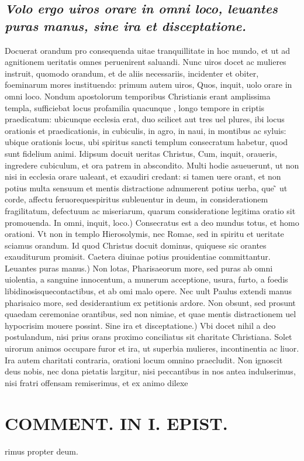 \documentclass{article}
\begin{document}
\begin{pages}
\subsection*{\textit{Volo ergo uiros orare in omni loco, leuantes puras manus, sine ira et disceptatione. }}\pstart Docuerat orandum pro consequenda uitae tranquillitate in hoc mundo, et ut ad agnitionem ueritatis omnes peruenirent saluandi. Nunc uiros docet ac mulieres instruit, quomodo orandum, et de aliis necessariis, incidenter et obiter, foeminarum mores instituendo: primum autem uiros, Quos, inquit, uolo orare in omni loco. Nondum apostolorum temporibus Christianis erant amplissima templa, sufficiebat locus profamilia quacunque , longo tempore in criptis praedicatum: ubicunque  ecclesia erat, duo scilicet aut tres uel plures, ibi locus orationis et praedicationis, in cubiculis, in agro, in naui, in montibus ac syluis: ubique  orationis locus, ubi spiritus sancti templum consecratum habetur, quod sunt fidelium animi. Idipsum docuit ueritas Christus, Cum, inquit, oraueris, ingredere cubiculum, et ora patrem in abscondito. Multi hodie asueuerunt, ut non nisi in ecclesia orare ualeant, et exaudiri credant: si tamen uere orant, et non potius multa sensuum et mentis distractione adnumerent potius uerba, que ̃ ut corde, affectu feruorequespiritus subleuentur in deum, in considerationem fragilitatum, defectuum ac miseriarum, quarum consideratione legitima oratio sit promouenda. In omni, inquit, loco.) Consecratus est a deo mundus totus, et homo orationi. Vt non in templo Hierosolymis, nec Romae, sed in spiritu et ueritate sciamus orandum. Id quod Christus docuit dominus, quiquese sic orantes exauditurum promisit. Caetera diuinae potius prouidentiae committantur. Leuantes puras manus.) Non lotas, Pharisaeorum more, sed puras ab omni uiolentia, a sanguine innocentum, a munerum acceptione, usura, furto, a foedis libidinosisquecontactibus, et ab omi malo opere. Nec uult Paulus extendi manus pharisaico more, sed desiderantium ex petitionis ardore. Non obsunt, sed prosunt quaedam ceremoniae orantibus, sed non nimiae, et quae mentis distractionem uel hypocrisim mouere possint. Sine ira et disceptatione.) Vbi docet nihil a deo postulandum, nisi prius orans proximo conciliatus sit charitate Christiana. Solet uirorum animos occupare furor et ira, ut superbia mulieres, incontinentia ac liuor. Ira autem charitati contraria, orationi locum omnino praecludit. Non ignoscit deus nobis, nec dona pietatis largitur, nisi peccantibus in nos antea indulserimus, nisi fratri offensam remiserimus, et ex animo dilexe\pend
\section*{COMMENT. IN I. EPIST. }
\marginpar{[ p.486 ]}\pstart rimus propter deum.  \pend
{}
{}

\end{pages}
\end{document}
